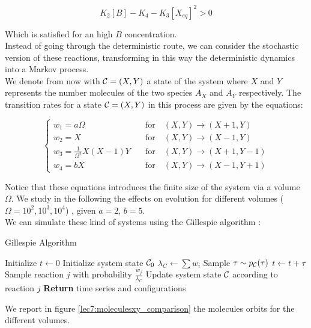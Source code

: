 $$ K_2 [B] - K_4 - K_3[X_{eq}]^2 > 0 $$

Which is satisfied for an high $B$ concentration. \\

Instead of going through the deterministic route, we can consider the stochastic version of these reactions, transforming in this way the deterministic dynamics into a Markov process. \\

We denote from now with $ \mathcal{C}=(X,Y)$ a state of the system where $X$ and $Y$ represents the number molecules of the two species $A_X$ and $A_Y$
respectively. The transition rates for a state $ \mathcal{C}=(X,Y)$ in this process are given by the equations:

$$
\begin{cases}
    w_{1} = a\Omega \quad &\text{for}\quad(X,Y)\to(X+1,Y)\\
    w_{2} = X\quad&\text{for}\quad(X,Y)\to(X-1,Y)\\
    w_{3} = \frac{1}{\Omega^{2}}X(X-1)Y\quad&\text{for}\quad(X,Y)\to(X+1,Y-1)\\
    w_{4} = bX\quad&\text{for}\quad(X,Y)\to(X-1,Y+1)
\end{cases}
$$

Notice that these equations introduces the finite size of the system via a volume $\Omega$. 
We study in the following the effects on evolution for different volumes ($\Omega = 10^2, 10^3, 10^4$) , given $a = 2$, $b = 5$.  \\
We can simulate these kind of systems using the Gillespie algorithm :

\begin{algorithm}
    \caption{Gillespie Algorithm}
    \begin{algorithmic}[1]
    \State Initialize \( t \leftarrow 0 \) 
    \State Initialize system state \( \mathcal{C}_0 \)
        \State \( \lambda_C \leftarrow \sum w_i \) 
        \State Sample \( \tau \sim p_{\mathcal{C}}(\tau) \) 
        \State \( t \leftarrow t + \tau \) 
        \State Sample reaction \( j \) with probability \( \frac{w_j}{\lambda_C} \) 
        \State Update system state \( \mathcal{C} \) according to reaction \( j \)
    \EndWhile
    \State \textbf{Return} time series and configurations
    \end{algorithmic}
    \label{gillespie}
\end{algorithm}


We report in figure \ref{lec7:moleculesxy_comparison} the molecules orbits for the different volumes.

